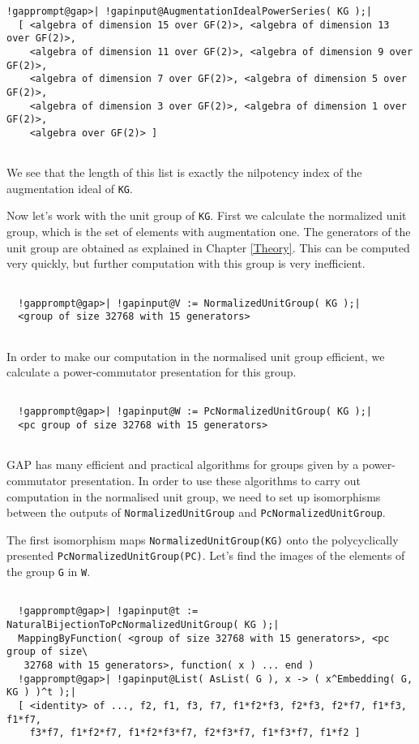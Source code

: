 \documentclass[a4paper,11pt]{report}
\begin{document}
{\begin{Verbatim}[commandchars=!@|,fontsize=\small,frame=single,label=Example]
  !gapprompt@gap>| !gapinput@AugmentationIdealPowerSeries( KG );|
  [ <algebra of dimension 15 over GF(2)>, <algebra of dimension 13 over GF(2)>, 
    <algebra of dimension 11 over GF(2)>, <algebra of dimension 9 over GF(2)>, 
    <algebra of dimension 7 over GF(2)>, <algebra of dimension 5 over GF(2)>, 
    <algebra of dimension 3 over GF(2)>, <algebra of dimension 1 over GF(2)>, 
    <algebra over GF(2)> ]
  
\end{Verbatim}
 We see that the length of this list is exactly the nilpotency index of the
augmentation ideal of \texttt{KG}. 

 Now let's work with the unit group of \texttt{KG}. First we calculate the normalized unit group, which is the set of elements
with augmentation one. The generators of the unit group are obtained as
explained in Chapter \ref{Theory}. This can be computed very quickly, but further computation with this group
is very inefficient. 
\begin{Verbatim}[commandchars=!@|,fontsize=\small,frame=single,label=Example]
  
  !gapprompt@gap>| !gapinput@V := NormalizedUnitGroup( KG );|
  <group of size 32768 with 15 generators>   
  
\end{Verbatim}
 In order to make our computation in the normalised unit group efficient, we
calculate a power-commutator presentation for this group. 
\begin{Verbatim}[commandchars=!@|,fontsize=\small,frame=single,label=Example]
  
  !gapprompt@gap>| !gapinput@W := PcNormalizedUnitGroup( KG );|
  <pc group of size 32768 with 15 generators>
  
\end{Verbatim}
 \textsf{GAP} has many efficient and practical algorithms for groups given by a
power-commutator presentation. In order to use these algorithms to carry out
computation in the normalised unit group, we need to set up isomorphisms
between the outputs of \texttt{NormalizedUnitGroup} and \texttt{PcNormalizedUnitGroup}. 

 The first isomorphism maps \texttt{NormalizedUnitGroup(KG)} onto the polycyclically presented \texttt{PcNormalizedUnitGroup(PC)}. Let's find the images of the elements of the group \texttt{G} in \texttt{W}. 
\begin{Verbatim}[commandchars=!@|,fontsize=\small,frame=single,label=Example]
  
  !gapprompt@gap>| !gapinput@t := NaturalBijectionToPcNormalizedUnitGroup( KG );|
  MappingByFunction( <group of size 32768 with 15 generators>, <pc group of size\
   32768 with 15 generators>, function( x ) ... end )
  !gapprompt@gap>| !gapinput@List( AsList( G ), x -> ( x^Embedding( G, KG ) )^t );|
  [ <identity> of ..., f2, f1, f3, f7, f1*f2*f3, f2*f3, f2*f7, f1*f3, f1*f7,
    f3*f7, f1*f2*f7, f1*f2*f3*f7, f2*f3*f7, f1*f3*f7, f1*f2 ]
  

\end{Verbatim}}
\end{document}
